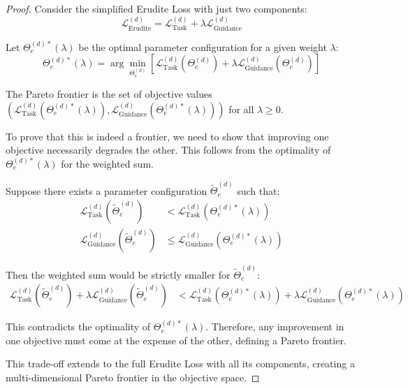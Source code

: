 \begin{proof}
Consider the simplified Erudite Loss with just two components:
\begin{equation}
\mathcal{L}_{\text{Erudite}}^{(d)} = \mathcal{L}_{\text{Task}}^{(d)} + \lambda \mathcal{L}_{\text{Guidance}}^{(d)}
\end{equation}

Let $\Theta_e^{(d)*}(\lambda)$ be the optimal parameter configuration for a given weight $\lambda$:
\begin{equation}
\Theta_e^{(d)*}(\lambda) = \arg\min_{\Theta_e^{(d)}} \left[\mathcal{L}_{\text{Task}}^{(d)}(\Theta_e^{(d)}) + \lambda \mathcal{L}_{\text{Guidance}}^{(d)}(\Theta_e^{(d)})\right]
\end{equation}

The Pareto frontier is the set of objective values $\left(\mathcal{L}_{\text{Task}}^{(d)}(\Theta_e^{(d)*}(\lambda)), \mathcal{L}_{\text{Guidance}}^{(d)}(\Theta_e^{(d)*}(\lambda))\right)$ for all $\lambda \geq 0$.

To prove that this is indeed a frontier, we need to show that improving one objective necessarily degrades the other. This follows from the optimality of $\Theta_e^{(d)*}(\lambda)$ for the weighted sum.

Suppose there exists a parameter configuration $\tilde{\Theta}_e^{(d)}$ such that:
\begin{align}
\mathcal{L}_{\text{Task}}^{(d)}(\tilde{\Theta}_e^{(d)}) &< \mathcal{L}_{\text{Task}}^{(d)}(\Theta_e^{(d)*}(\lambda)) \\
\mathcal{L}_{\text{Guidance}}^{(d)}(\tilde{\Theta}_e^{(d)}) &\leq \mathcal{L}_{\text{Guidance}}^{(d)}(\Theta_e^{(d)*}(\lambda))
\end{align}

Then the weighted sum would be strictly smaller for $\tilde{\Theta}_e^{(d)}$:
\begin{align}
\mathcal{L}_{\text{Task}}^{(d)}(\tilde{\Theta}_e^{(d)}) + \lambda \mathcal{L}_{\text{Guidance}}^{(d)}(\tilde{\Theta}_e^{(d)}) &< \mathcal{L}_{\text{Task}}^{(d)}(\Theta_e^{(d)*}(\lambda)) + \lambda \mathcal{L}_{\text{Guidance}}^{(d)}(\Theta_e^{(d)*}(\lambda))
\end{align}

This contradicts the optimality of $\Theta_e^{(d)*}(\lambda)$. Therefore, any improvement in one objective must come at the expense of the other, defining a Pareto frontier.

This trade-off extends to the full Erudite Loss with all its components, creating a multi-dimensional Pareto frontier in the objective space.
\end{proof}

